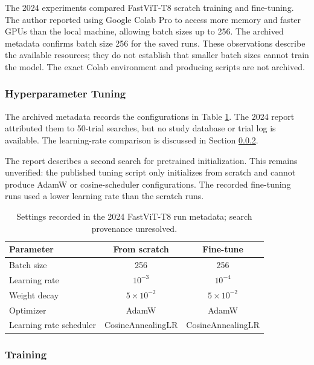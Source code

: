 \documentclass[12pt]{article}
\begin{document}
The 2024 experiments compared FastViT-T8 scratch training and fine-tuning. The author reported using Google Colab Pro to access more memory and faster GPUs than the local machine, allowing batch sizes up to 256. The archived metadata confirms batch size 256 for the saved runs. These observations describe the available resources; they do not establish that smaller batch sizes cannot train the model. The exact Colab environment and producing scripts are not archived.

\subsubsection{Hyperparameter Tuning}

The archived metadata records the configurations in Table \ref{tab:hyperparameters}. The 2024 report attributed them to 50-trial searches, but no study database or trial log is available. The learning-rate comparison is discussed in Section \ref{sec:training_fastvit}.

The report describes a second search for pretrained initialization. This remains unverified: the published tuning script only initializes from scratch and cannot produce AdamW or cosine-scheduler configurations. The recorded fine-tuning runs used a lower learning rate than the scratch runs.

\begin{table}[tbp]
    \centering
    \doublespacing
    \captionsetup{justification=centering,margin=1cm}
    \begin{tabular}{l|c|c}
        \hline
        \textbf{Parameter} & \textbf{From scratch} & \textbf{Fine-tune} \\
        \hline
        Batch size & 256 & 256 \\
        \hline
        Learning rate & $10^{-3}$ & $10^{-4}$ \\
        \hline
        Weight decay & $5 \times 10^{-2}$ & $5 \times 10^{-2}$ \\
        \hline
        Optimizer & AdamW & AdamW \\
        \hline
        Learning rate scheduler & CosineAnnealingLR & CosineAnnealingLR \\
        \hline
    \end{tabular}
    \caption{Settings recorded in the 2024 FastViT-T8 run metadata; search provenance unresolved.}
    \label{tab:hyperparameters}
\end{table}

\subsubsection{Training} \label{sec:training_fastvit}
\end{document}
